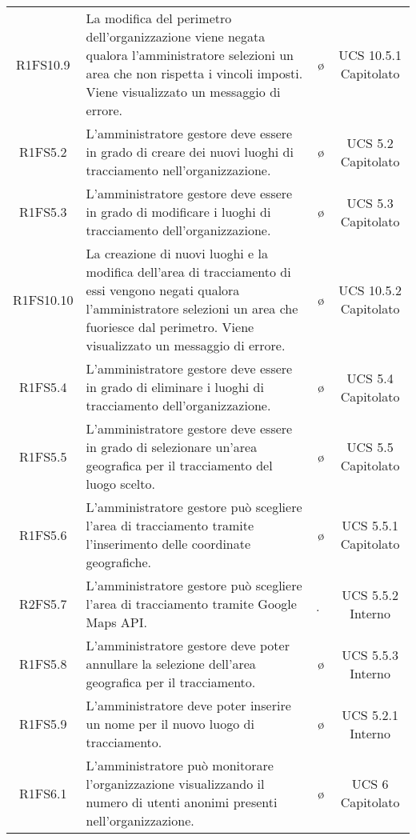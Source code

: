 {\begin{longtable}{ c C{6.5cm} c c}
R1FS10.9 & La modifica del perimetro dell'organizzazione viene negata qualora l'amministratore selezioni un area che non rispetta i vincoli imposti. Viene visualizzato un messaggio di errore. & \o & UCS 10.5.1 Capitolato \\

R1FS5.2 & L'amministratore gestore deve essere in grado di creare dei nuovi luoghi di tracciamento nell'organizzazione. & \o & UCS 5.2 Capitolato\\

R1FS5.3 & L'amministratore gestore deve essere in grado di modificare i luoghi di tracciamento dell'organizzazione. & \o & UCS 5.3 Capitolato\\

R1FS10.10 & La creazione di nuovi luoghi e la modifica dell'area di tracciamento di essi vengono negati qualora l'amministratore selezioni un area che fuoriesce dal perimetro. Viene visualizzato un messaggio di errore. & \o & UCS 10.5.2 Capitolato \\

R1FS5.4 & L'amministratore gestore deve essere in grado di eliminare i luoghi di tracciamento dell'organizzazione. & \o & UCS 5.4 Capitolato\\

R1FS5.5 & L'amministratore gestore deve essere in grado di selezionare un'area geografica per il tracciamento del luogo scelto. & \o & UCS 5.5 Capitolato\\

R1FS5.6 & L'amministratore gestore può scegliere l'area di tracciamento tramite l'inserimento delle coordinate geografiche. & \o & UCS 5.5.1 Capitolato\\

R2FS5.7 & L'amministratore gestore può scegliere l'area di tracciamento tramite Google Maps API. & \d & UCS 5.5.2 Interno\\

R1FS5.8 & L'amministratore gestore deve poter annullare la selezione dell'area geografica per il tracciamento. & \o & UCS 5.5.3 Interno\\

R1FS5.9 & L'amministratore deve poter inserire un nome per il nuovo luogo di tracciamento. & \o & UCS 5.2.1 Interno\\

R1FS6.1 & L'amministratore può monitorare l'organizzazione visualizzando il numero di utenti anonimi presenti nell'organizzazione. & \o & UCS 6 Capitolato\\


\end{longtable}}

